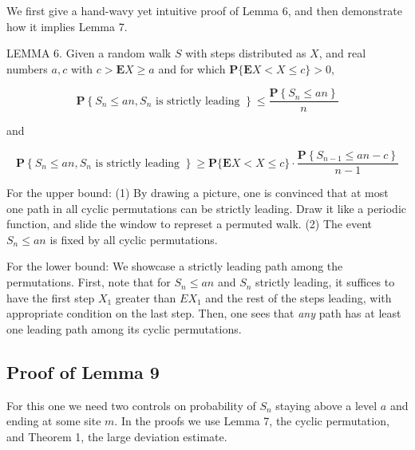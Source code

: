 We first give a hand-wavy yet intuitive proof of Lemma 6, and then demonstrate how it implies Lemma 7.

\begin{tcolorbox}[title=,colback=gray!10,colframe=black,breakable]
    LEMMA 6. Given a random walk $S$ with steps distributed as $X$, and real numbers $a, c$ with $c>\mathbf{E} X \geq a$ and for which $\mathbf{P}\{\mathbf{E} X<X \leq c\}>0$,

\[
\mathbf{P}\left\{S_n \leq a n, S_n \text { is strictly leading }\right\} \leq \frac{\mathbf{P}\left\{S_n \leq a n\right\}}{n}
\]

and

\[
\mathbf{P}\left\{S_n \leq a n, S_n \text { is strictly leading }\right\} \geq \mathbf{P}\{\mathbf{E} X<X \leq c\} \cdot \frac{\mathbf{P}\left\{S_{n-1} \leq a n-c\right\}}{n-1}
\]

\end{tcolorbox}

For the upper bound: (1) By drawing a picture, one is convinced that at most one path in all cyclic permutations can be strictly leading. Draw it like a periodic function, and slide the window to represet a permuted walk. (2) The event $S_n \le an$ is fixed by all cyclic permutations.

For the lower bound: We showcase a strictly leading path among the permutations. First, note that for $S_n \le a n$ and $S_n$ strictly leading, it suffices to have the first step $X_1$ greater than $EX_1$ and the rest of the steps leading, with appropriate condition on the last step. Then, one sees that \textit{any} path has at least one leading path among its cyclic permutations.


\subsection{Proof of Lemma 9} 

For this one we need two controls on probability of $S_n$ staying above a level $a$ and ending at some site $m$. In the proofs we use Lemma 7, the cyclic permutation, and Theorem 1, the large deviation estimate.

